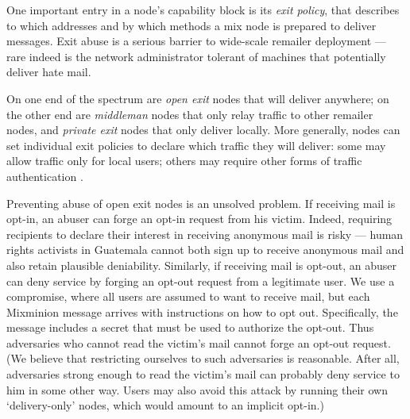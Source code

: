 \documentclass[times,10pt,twocolumn]{article}
\begin{document}
\label{subsec:exitpolicies}

One important entry in a node's capability block is its \emph{exit
policy}, that describes to which addresses and by which methods a mix node is
prepared to deliver messages. Exit abuse is a serious barrier to
wide-scale remailer deployment 
--- rare indeed is the network administrator tolerant of machines that
potentially deliver hate mail. %

On one end of the spectrum are \emph{open exit} nodes that will
deliver anywhere; on the other end are \emph{middleman} nodes that
only relay traffic to other remailer nodes, and \emph{private exit}
nodes that only deliver locally. More generally, nodes can set
individual exit policies to declare which traffic they will deliver:
some may allow traffic only for local users; others may require
other forms of traffic authentication
\cite{onion-discex00}.

Preventing abuse of open exit nodes is an unsolved problem. If
receiving mail is opt-in, an abuser can forge an opt-in request from
his victim. Indeed, requiring recipients to declare their interest
in receiving anonymous mail is risky --- human rights activists in
Guatemala cannot both sign up to receive anonymous mail and also retain
plausible deniability. %
Similarly, if receiving mail is opt-out, an abuser can deny service
by forging an opt-out request from a legitimate user. We use a compromise,
where all users are assumed to want to receive mail, but each Mixminion
message arrives with instructions on how to opt out. 
Specifically, the
message includes a secret that must be used to authorize the opt-out. Thus
adversaries who cannot read the victim's mail cannot forge an opt-out
request.  (We believe that restricting ourselves to such adversaries is
reasonable.  After all, adversaries strong enough to read the victim's mail
can probably deny service to him in some other way.  Users may also avoid
this attack by running their own `delivery-only' nodes, which would amount to
an implicit opt-in.)
\end{document}
